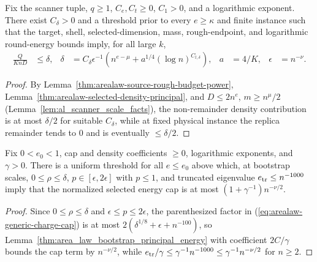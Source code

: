 \begin{lemma}
    \label{thm:arealaw-rough-selected-density}
    \leanok
    Fix the scanner tuple, $q\geq1$, $C_e,C_t\geq0$, $C_1>0$, and a logarithmic exponent.
    There exist $C_\delta>0$ and a threshold prior to every $e\geq\kappa$ and finite instance
    such that the target, shell, selected-dimension, mass, rough-endpoint, and logarithmic
    round-energy bounds imply, for all large $k$,
    \begin{align}
        \frac{Q}{KnD} & \leq\delta,
                      & \delta      & =C_\delta\epsilon^{-1}
        \left(n^{e-\mu}+a^{1/4}(\log n)^{C_{l,\delta}}\right),
                      & a           & =4/K,                  & \epsilon & =n^{-\nu}.
        \label{eq:arealaw-rough-principal-density}
    \end{align}
\end{lemma}
\begin{proof}
    \leanok
    By Lemma~\ref{thm:arealaw-source-rough-budget-power}, Lemma~\ref{thm:arealaw-selected-density-principal},
    and $D\leq2n^e$, $m\geq n^\mu/2$ (Lemma~\ref{lem:al_scanner_scale_facts}), the non-remainder
    density contribution is at most $\delta/2$ for suitable $C_\delta$, while at fixed physical
    instance the replica remainder tends to $0$ and is eventually $\le\delta/2$.
\end{proof}


\begin{lemma}
    \label{thm:arealaw-bootstrap-selected-energy}
    \leanok
    Fix $0<e_0<1$, cap and density coefficients $\ge0$, logarithmic exponents, and $\gamma>0$.
    There is a uniform threshold for all $e\leq e_0$ above which, at bootstrap scales,
    $0\leq\rho\leq\delta$, $p\in[\epsilon,2\epsilon]$ with $p\leq1$, and truncated eigenvalue
    $e_{\rm tr}\le n^{-1000}$ imply that the normalized selected energy cap is at most
    $(1+\gamma^{-1})n^{-\nu/2}$.
\end{lemma}
\begin{proof}
    \leanok
    Since $0\leq\rho\leq\delta$ and $\epsilon\leq p\leq2\epsilon$, the parenthesized factor in
    (\ref{eq:arealaw-generic-charge-cap}) is at most $2(\delta^{1/8}+\epsilon+n^{-100})$, so
    Lemma~\ref{thm:area_law_bootstrap_principal_energy} with coefficient $2C/\gamma$ bounds the
    cap term by $n^{-\nu/2}$, while $e_{\rm tr}/\gamma\le\gamma^{-1}n^{-1000}\leq\gamma^{-1}n^{-\nu/2}$
    for $n\geq2$.
\end{proof}


